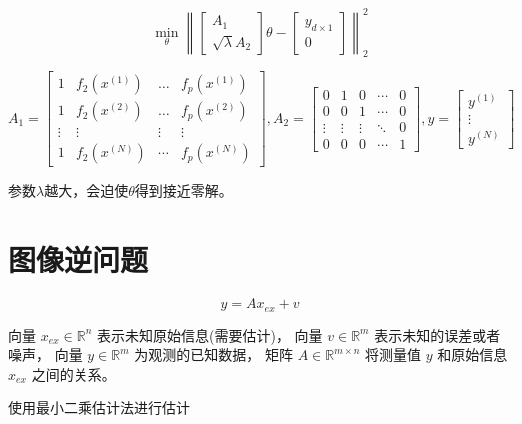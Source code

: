 \begin{problem}
    $$
\min _{\theta}\left\|\left[\begin{array}{r}
A_{1} \\
\sqrt{\lambda} A_{2}
\end{array}\right] \theta-\left[\begin{array}{l}
y_{d \times 1} \\
0
\end{array}\right]\right\|_{2}^{2}
$$

$$ A_{1}=\left[\begin{array}{cccc}1 & f_{2}\left(x^{(1)}\right) & \ldots & f_{p}\left(x^{(1)}\right) \\ 1 & f_{2}\left(x^{(2)}\right) & \ldots & f_{p}\left(x^{(2)}\right) \\ \vdots & \vdots & \vdots & \vdots \\ 1 & f_{2}\left(x^{(N)}\right) & \cdots & f_{p}\left(x^{(N)}\right)\end{array}\right],  A_{2}=\left[\begin{array}{ccccc}0 & 1 & 0 & \cdots & 0 \\ 0 & 0 & 1 & \cdots & 0 \\ \vdots & \vdots & \vdots & \ddots & 0 \\ 0 & 0 & 0 & \cdots & 1\end{array}\right], y=\left[\begin{array}{c}y^{(1)} \\ \vdots \\ y^{(N)}\end{array}\right] $$
\end{problem}

参数$\lambda$越大，会迫使$\theta$得到接近零解。

\section{图像逆问题}

\begin{problem}
    $$ y=A x_{e x}+v $$

向量 $ x_{e x} \in \mathbb{R}^{n} $ 表示未知原始信息(需要估计)，
向量 $ v \in \mathbb{R}^{m} $ 表示未知的误差或者噪声，
向量 $ y \in \mathbb{R}^{m} $ 为观测的已知数据，
矩阵 $ A \in \mathbb{R}^{m \times n} $ 将测量值 $ y $ 和原始信息 $ x_{e x} $ 之间的关系。


\end{problem}

使用最小二乘估计法进行估计

